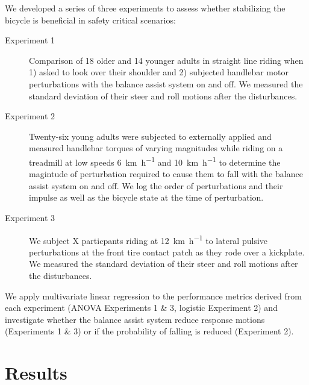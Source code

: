 \documentclass{icsc}
\def\kph{\kilo\meter\per\hour}
\begin{document}
We developed a series of three experiments to assess whether stabilizing the
bicycle is beneficial in safety critical scenarios:
\begin{description}
  \item[Experiment 1] Comparison of 18 older and 14 younger adults in straight
    line riding when 1) asked to look over their shoulder and 2) subjected
    handlebar motor perturbations with the balance assist system on and off. We
    measured the standard deviation of their steer and roll motions after the
    disturbances.
  \item[Experiment 2] Twenty-six young adults were subjected to externally
    applied and measured handlebar torques of varying magnitudes while riding
    on a treadmill at low speeds 6~\si{\kph} and 10~\si{\kph} to determine the
    magintude of perturbation required to cause them to fall with the balance
    assist system on and off. We log the order of perturbations and their
    impulse as well as the bicycle state at the time of perturbation.
  \item[Experiment 3] We subject X particpants riding at 12~\si{\kph} to
    lateral pulsive perturbations at the front tire contact patch as they rode
    over a kickplate. We measured the standard deviation of their steer and
    roll motions after the disturbances.
\end{description}

\begin{figure}
  \begin{center}
    \label{fig:fig1}
  \end{center}
\end{figure}

We apply multivariate linear regression to the performance metrics derived from
each experiment (ANOVA Experiments 1 \& 3, logistic Experiment 2) and
investigate whether the balance assist system reduce response motions
(Experiments 1 \& 3) or if the probability of falling is reduced (Experiment
2).

\section{Results}

\thispagestyle{empty}
\end{document}
